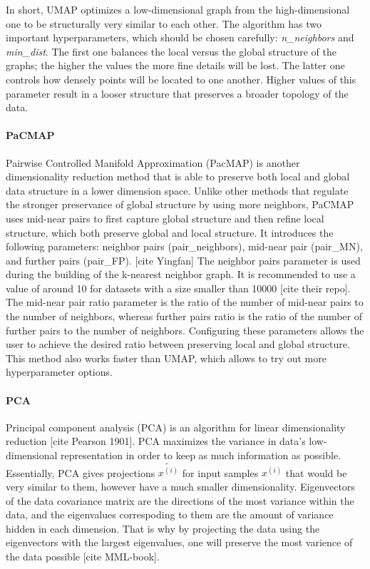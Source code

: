 In short, UMAP optimizes a low-dimensional graph from the high-dimensional one to be structurally very similar to each other. The algorithm has two important hyperparameters, which should be chosen carefully: \textit{n\_neighbors} and \textit{min\_dist}. The first one balances the local versus the global structure of the graphs; the higher the values the more fine details will be lost. The latter one controls how densely points will be located to one another. Higher values of this parameter result in a looser structure that preserves a broader topology of the data. 

\paragraph{PaCMAP}
Pairwise Controlled Manifold Approximation (PacMAP) is another dimensionality reduction method that is able to preserve both local and global data structure in a lower dimension space. Unlike other methods that regulate the stronger preservance of global structure by using more neighbors, PaCMAP uses mid-near pairs to first capture global structure and then refine local structure, which both preserve global and local structure. It introduces the following parameters: neighbor pairs (pair\_neighbors), mid-near pair (pair\_MN), and further pairs (pair\_FP). [cite Yingfan] The neighbor pairs parameter is used during the building of the k-nearest neighbor graph. It is recommended to use a value of around 10 for datasets with a size smaller than 10000 [cite their repo]. The mid-near pair ratio parameter is the ratio of the number of mid-near pairs to the number of neighbors, whereas further pairs ratio is the ratio of the number of further pairs to the number of neighbors. Configuring these parameters allows the user to achieve the desired ratio between preserving local and global structure. This method also works faster than UMAP, which allows to try out more hyperparameter options.

\paragraph{PCA}
Principal component analysis (PCA) is an algorithm for linear dimensionality reduction [cite Pearson 1901].  PCA maximizes the variance in data's low-dimensional representation in order to keep as much information as possible. Essentially, PCA gives projections $\tilde{x^{(i)}}$ for input samples $x^{(i)}$ that would be very similar to them, however have a much smaller dimensionality. Eigenvectors of the data covariance matrix are the directions of the most variance within the data, and the eigenvalues correspoding to them are the amount of variance hidden in each dimension. That is why by projecting the data using the eigenvectors with the largest eigenvalues, one will preserve the most varience of the data possible [cite MML-book].

